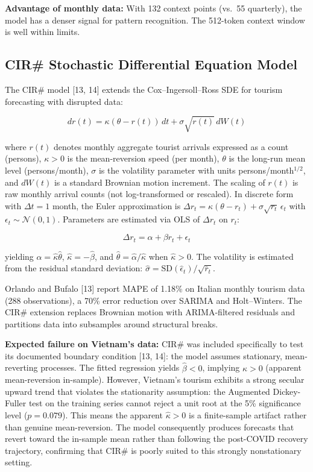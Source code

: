 \documentclass[
]{article}
\begin{document}
\textbf{Advantage of monthly data:} With 132 context points (vs.~55
quarterly), the model has a denser signal for pattern recognition. The
512-token context window is well within limits.

\subsection{CIR\# Stochastic Differential Equation
Model}\label{cir-stochastic-differential-equation-model}

The CIR\# model {[}13, 14{]} extends the Cox--Ingersoll--Ross SDE for
tourism forecasting with disrupted data:

\[dr(t) = \kappa(\theta - r(t))\,dt + \sigma\sqrt{r(t)}\,dW(t)\]

where \(r(t)\) denotes monthly aggregate tourist arrivals expressed as a
count (persons), \(\kappa > 0\) is the mean-reversion speed (per month),
\(\theta\) is the long-run mean level (persons/month), \(\sigma\) is the
volatility parameter with units persons/month\(^{1/2}\), and \(dW(t)\)
is a standard Brownian motion increment. The scaling of \(r(t)\) is raw
monthly arrival counts (not log-transformed or rescaled). In discrete
form with \(\Delta t = 1\) month, the Euler approximation is
\(\Delta r_t = \kappa(\theta - r_t) + \sigma\sqrt{r_t}\,\epsilon_t\)
with \(\epsilon_t \sim \mathcal{N}(0,1)\). Parameters are estimated via
OLS of \(\Delta r_t\) on \(r_t\):

\[\Delta r_t = \alpha + \beta r_t + \epsilon_t\]

yielding \(\hat{\alpha} = \hat{\kappa}\hat{\theta}\),
\(\hat{\kappa} = -\hat{\beta}\), and
\(\hat{\theta} = \hat{\alpha}/\hat{\kappa}\) when \(\hat{\kappa} > 0\).
The volatility is estimated from the residual standard deviation:
\(\hat{\sigma} = \text{SD}(\hat{\epsilon}_t) / \sqrt{\bar{r}_t}\).

Orlando and Bufalo {[}13{]} report MAPE of 1.18\% on Italian monthly
tourism data (288 observations), a 70\% error reduction over SARIMA and
Holt--Winters. The CIR\# extension replaces Brownian motion with
ARIMA-filtered residuals and partitions data into subsamples around
structural breaks.

\textbf{Expected failure on Vietnam's data:} CIR\# was included
specifically to test its documented boundary condition {[}13, 14{]}: the
model assumes stationary, mean-reverting processes. The fitted
regression yields \(\hat{\beta} < 0\), implying \(\hat{\kappa} > 0\)
(apparent mean-reversion in-sample). However, Vietnam's tourism exhibits
a strong secular upward trend that violates the stationarity assumption:
the Augmented Dickey-Fuller test on the training series cannot reject a
unit root at the 5\% significance level (\(p = 0.079\)). This means the
apparent \(\hat{\kappa} > 0\) is a finite-sample artifact rather than
genuine mean-reversion. The model consequently produces forecasts that
revert toward the in-sample mean rather than following the post-COVID
recovery trajectory, confirming that CIR\# is poorly suited to this
strongly nonstationary setting.
\end{document}
